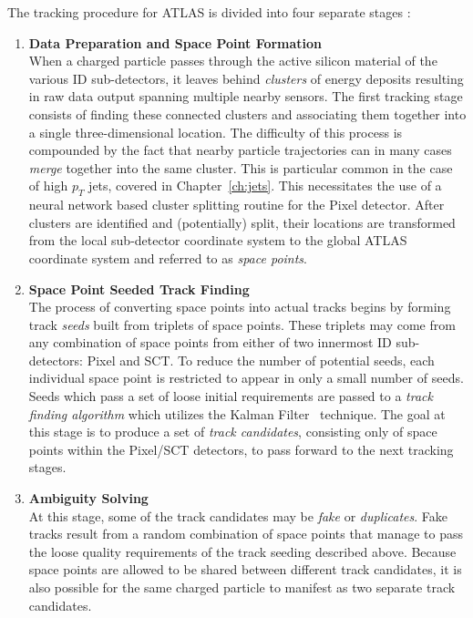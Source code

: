 The tracking procedure for ATLAS is divided into four separate stages \cite{Salzburger:2015sgq}:
\begin{enumerate}
    \item \textbf{Data Preparation and Space Point Formation}\\
        When a charged particle passes through the active silicon material of the various ID sub-detectors, it leaves behind \textit{clusters} of energy deposits resulting in raw data output spanning multiple nearby sensors.
        The first tracking stage consists of finding these connected clusters and associating them together into a single three-dimensional location.
        The difficulty of this process is compounded by the fact that nearby particle trajectories can in many cases \textit{merge} together into the same cluster.
        This is particular common in the case of high $p_T$ jets, covered in Chapter~\ref{ch:jets}.
        This necessitates the use of a neural network based cluster splitting routine for the Pixel detector.
        After clusters are identified and (potentially) split, their locations are transformed from the local sub-detector coordinate system to the global ATLAS coordinate system and referred to as \textit{space points}.
    \item \textbf{Space Point Seeded Track Finding}\\
        The process of converting space points into actual tracks begins by forming track \textit{seeds} built from triplets of space points.
        These triplets may come from any combination of space points from either of two innermost ID sub-detectors: Pixel and SCT.
        To reduce the number of potential seeds, each individual space point is restricted to appear in only a small number of seeds.
        Seeds which pass a set of loose initial requirements are passed to a \textit{track finding algorithm} which utilizes the Kalman Filter~\cite{KalmanRE} technique.
        The goal at this stage is to produce a set of \textit{track candidates}, consisting only of space points within the Pixel/SCT detectors, to pass forward to the next tracking stages.
    \item \textbf{Ambiguity Solving}\\
        At this stage, some of the track candidates may be \textit{fake} or \textit{duplicates}.
        Fake tracks result from a random combination of space points that manage to pass the loose quality requirements of the track seeding described above.
        Because space points are allowed to be shared between different track candidates, it is also possible for the same charged particle to manifest as two separate track candidates.

\end{enumerate}
